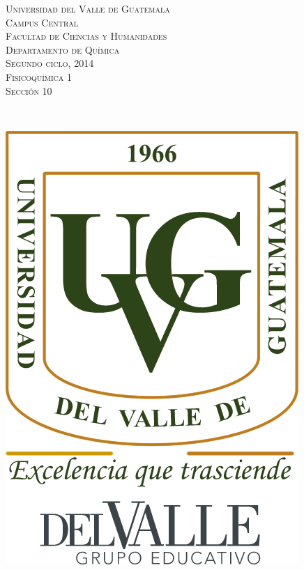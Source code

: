 \documentclass[a4paper,12pt]{article}
\begin{document}
\newcommand{\HRule}{\rule{\linewidth}{0.4mm}} %


\begin{minipage}{0.7\textwidth}
\begin{flushleft} 
\textsc{Universidad del Valle de Guatemala \\
Campus Central \\
Facultad de Ciencias y Humanidades \\
Departamento de Qu\'imica \\
Segundo ciclo, 2014 \\
Fisicoqu\'imica 1 \\
Secci\'on 10 \\
}
\end{flushleft}
\end{minipage}
~
\begin{minipage}{0.2\textwidth}
\begin{flushright}
\includegraphics[scale=0.35]{Logo_UVG} %
\end{flushright}
\end{minipage}\\
\end{document}
